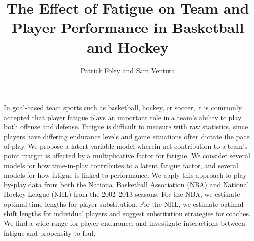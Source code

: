 \documentclass{article}
\author{Patrick Foley and Sam Ventura}
\title{The Effect of Fatigue on Team and Player Performance in Basketball and Hockey}
\begin{document}
\maketitle{}

In goal-based team sports such as basketball, hockey, or soccer, it is commonly accepted that player fatigue plays an important role in a team's ability to play both offense and defense.  Fatigue is difficult to measure with raw statistics, since players have differing endurance levels and game situations often dictate the pace of play.  We propose a latent variable model wherein net contribution to a team's point margin is affected by a multiplicative factor for fatigue.  We consider several models for how time-in-play contributes to a latent fatigue factor, and several models for how fatigue is linked to performance.  We apply this approach to play-by-play data from both the National Basketball Association (NBA) and National Hockey League (NHL) from the 2002--2013 seasons.  For the NBA, we estimate optimal time lengths for player substitution.  For the NHL, we estimate optimal shift lengths for individual players and suggest substitution strategies for coaches.  We find a wide range for player endurance, and investigate interactions between fatigue and propensity to foul.  
\end{document}
